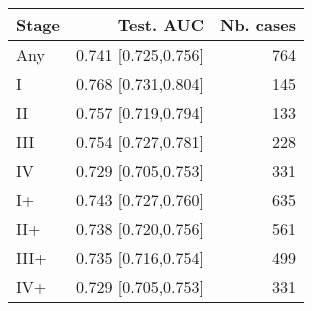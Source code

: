 \begin{table}[ht]
\centering
\begin{tabular}{lrr}
  \toprule
Stage & Test. AUC & Nb. cases \\ 
  \midrule
Any & 0.741 [0.725,0.756] & 764 \\ 
   \addlinespace
I & 0.768 [0.731,0.804] & 145 \\ 
  II & 0.757 [0.719,0.794] & 133 \\ 
  III & 0.754 [0.727,0.781] & 228 \\ 
  IV & 0.729 [0.705,0.753] & 331 \\ 
   \addlinespace
I+ & 0.743 [0.727,0.760] & 635 \\ 
  II+ & 0.738 [0.720,0.756] & 561 \\ 
  III+ & 0.735 [0.716,0.754] & 499 \\ 
  IV+ & 0.729 [0.705,0.753] & 331 \\ 
   \bottomrule
\end{tabular}
\end{table}
